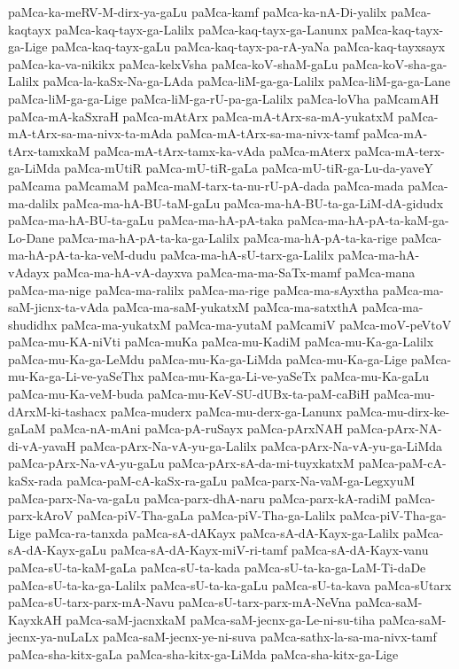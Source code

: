 {paMca-ka-meRV-M-dirx-ya-gaLu
paMca-kamf
paMca-ka-nA-Di-yalilx
paMca-kaqtayx
paMca-kaq-tayx-ga-Lalilx
paMca-kaq-tayx-ga-Lanunx
paMca-kaq-tayx-ga-Lige
paMca-kaq-tayx-gaLu
paMca-kaq-tayx-pa-rA-yaNa
paMca-kaq-tayxsayx
paMca-ka-va-nikikx
paMca-kelxVsha
paMca-koV-shaM-gaLu
paMca-koV-sha-ga-Lalilx
paMca-la-kaSx-Na-ga-LAda
paMca-liM-ga-ga-Lalilx
paMca-liM-ga-ga-Lane
paMca-liM-ga-ga-Lige
paMca-liM-ga-rU-pa-ga-Lalilx
paMca-loVha
paMcamAH
paMca-mA-kaSxraH
paMca-mAtArx
paMca-mA-tArx-sa-mA-yukatxM
paMca-mA-tArx-sa-ma-nivx-ta-mAda
paMca-mA-tArx-sa-ma-nivx-tamf
paMca-mA-tArx-tamxkaM
paMca-mA-tArx-tamx-ka-vAda
paMca-mAterx
paMca-mA-terx-ga-LiMda
paMca-mUtiR
paMca-mU-tiR-gaLa
paMca-mU-tiR-ga-Lu-da-yaveY
paMcama
paMcamaM
paMca-maM-tarx-ta-nu-rU-pA-dada
paMca-mada
paMca-ma-dalilx
paMca-ma-hA-BU-taM-gaLu
paMca-ma-hA-BU-ta-ga-LiM-dA-gidudx
paMca-ma-hA-BU-ta-gaLu
paMca-ma-hA-pA-taka
paMca-ma-hA-pA-ta-kaM-ga-Lo-Dane
paMca-ma-hA-pA-ta-ka-ga-Lalilx
paMca-ma-hA-pA-ta-ka-rige
paMca-ma-hA-pA-ta-ka-veM-dudu
paMca-ma-hA-sU-tarx-ga-Lalilx
paMca-ma-hA-vAdayx
paMca-ma-hA-vA-dayxva
paMca-ma-ma-SaTx-mamf
paMca-mana
paMca-ma-nige
paMca-ma-ralilx
paMca-ma-rige
paMca-ma-sAyxtha
paMca-ma-saM-jicnx-ta-vAda
paMca-ma-saM-yukatxM
paMca-ma-satxthA
paMca-ma-shudidhx
paMca-ma-yukatxM
paMca-ma-yutaM
paMcamiV
paMca-moV-peVtoV
paMca-mu-KA-niVti
paMca-muKa
paMca-mu-KadiM
paMca-mu-Ka-ga-Lalilx
paMca-mu-Ka-ga-LeMdu
paMca-mu-Ka-ga-LiMda
paMca-mu-Ka-ga-Lige
paMca-mu-Ka-ga-Li-ve-yaSeThx
paMca-mu-Ka-ga-Li-ve-yaSeTx
paMca-mu-Ka-gaLu
paMca-mu-Ka-veM-buda
paMca-mu-KeV-SU-dUBx-ta-paM-caBiH
paMca-mu-dArxM-ki-tashacx
paMca-muderx
paMca-mu-derx-ga-Lanunx
paMca-mu-dirx-ke-gaLaM
paMca-nA-mAni
paMca-pA-ruSayx
paMca-pArxNAH
paMca-pArx-NA-di-vA-yavaH
paMca-pArx-Na-vA-yu-ga-Lalilx
paMca-pArx-Na-vA-yu-ga-LiMda
paMca-pArx-Na-vA-yu-gaLu
paMca-pArx-sA-da-mi-tuyxkatxM
paMca-paM-cA-kaSx-rada
paMca-paM-cA-kaSx-ra-gaLu
paMca-parx-Na-vaM-ga-LegxyuM
paMca-parx-Na-va-gaLu
paMca-parx-dhA-naru
paMca-parx-kA-radiM
paMca-parx-kAroV
paMca-piV-Tha-gaLa
paMca-piV-Tha-ga-Lalilx
paMca-piV-Tha-ga-Lige
paMca-ra-tanxda
paMca-sA-dAKayx
paMca-sA-dA-Kayx-ga-Lalilx
paMca-sA-dA-Kayx-gaLu
paMca-sA-dA-Kayx-miV-ri-tamf
paMca-sA-dA-Kayx-vanu
paMca-sU-ta-kaM-gaLa
paMca-sU-ta-kada
paMca-sU-ta-ka-ga-LaM-Ti-daDe
paMca-sU-ta-ka-ga-Lalilx
paMca-sU-ta-ka-gaLu
paMca-sU-ta-kava
paMca-sUtarx
paMca-sU-tarx-parx-mA-Navu
paMca-sU-tarx-parx-mA-NeVna
paMca-saM-KayxkAH
paMca-saM-jacnxkaM
paMca-saM-jecnx-ga-Le-ni-su-tiha
paMca-saM-jecnx-ya-nuLaLx
paMca-saM-jecnx-ye-ni-suva
paMca-sathx-la-sa-ma-nivx-tamf
paMca-sha-kitx-gaLa
paMca-sha-kitx-ga-LiMda
paMca-sha-kitx-ga-Lige
}
